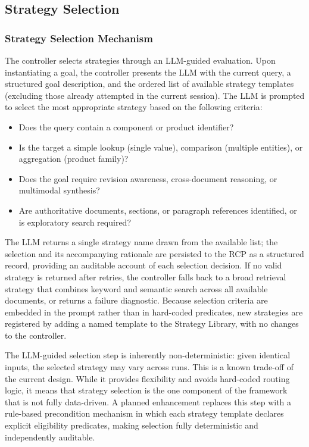 \documentclass[largeformat]{interact}
\begin{document}
\subsection{Strategy Selection}
\label{subsec:strategy_selection}

\subsubsection{Strategy Selection Mechanism}
\label{subsubsec:strategy_selection_mechanism}
The controller selects strategies through an LLM-guided evaluation. Upon instantiating a goal, the controller presents the LLM with the current query, a structured goal description, and the ordered list of available strategy templates (excluding those already attempted in the current session). The LLM is prompted to select the most appropriate strategy based on the following criteria:
\begin{itemize}[label=-]
    \item {} Does the query contain a component or product identifier?
    \item {} Is the target a simple lookup (single value), comparison (multiple entities), or aggregation (product family)?
    \item {} Does the goal require revision awareness, cross-document reasoning, or multimodal synthesis?
    \item {} Are authoritative documents, sections, or paragraph references identified, or is exploratory search required?
\end{itemize}
 
\noindent The LLM returns a single strategy name drawn from the available list; the selection and its accompanying rationale are persisted to the RCP as a structured record, providing an auditable account of each selection decision. If no valid strategy is returned after retries, the controller falls back to a broad retrieval strategy that combines keyword and semantic search across all available documents, or returns a failure diagnostic. Because selection criteria are embedded in the prompt rather than in hard-coded predicates, new strategies are registered by adding a named template to the Strategy Library, with no changes to the controller.
 
The LLM-guided selection step is inherently non-deterministic: given identical inputs, the selected strategy may vary across runs. This is a known trade-off of the current design. While it provides flexibility and avoids hard-coded routing logic, it means that strategy selection is the one component of the framework that is not fully data-driven. A planned enhancement replaces this step with a rule-based precondition mechanism in which each strategy template declares explicit eligibility predicates, making selection fully deterministic and independently auditable.
\end{document}
